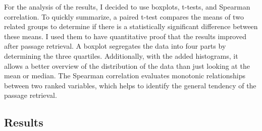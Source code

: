 For the analysis of the results, I decided to use boxplots, t-tests, and Spearman correlation. To quickly summarize, a paired t-test compares the means of two related groups to determine if there is a statistically significant difference between these means. I used them to have quantitative proof that the results improved after passage retrieval. A boxplot segregates the data into four parts by determining the three quartiles. Additionally, with the added histograms, it allows a better overview of the distribution of the data than just looking at the mean or median. The Spearman correlation evaluates monotonic relationships between two ranked variables, which helps to identify the general tendency of the passage retrieval.

\subsection{Results}
